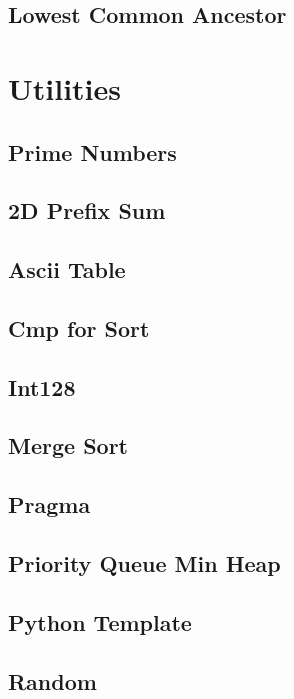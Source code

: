 \documentclass[10pt]{article}
\begin{document}
\subsection{\texorpdfstring{{Lowest Common Ancestor}}{{Lowest Common Ancestor}}}


\section{Utilities}
\subsection{\texorpdfstring{{Prime Numbers}}{{Prime Numbers}}}

\subsection{\texorpdfstring{{2D Prefix Sum}}{{2D Prefix Sum}}}

\subsection{\texorpdfstring{{Ascii Table}}{{Ascii Table}}}

\subsection{\texorpdfstring{{Cmp for Sort}}{{Cmp for Sort}}}

\subsection{\texorpdfstring{{Int128}}{{Int128}}}

\subsection{\texorpdfstring{{Merge Sort}}{{Merge Sort}}}

\subsection{\texorpdfstring{{Pragma}}{{Pragma}}}

\subsection{\texorpdfstring{{Priority Queue Min Heap}}{{Priority Queue Min Heap}}}

\subsection{\texorpdfstring{{Python Template}}{{Python Template}}}

\subsection{\texorpdfstring{{Random}}{{Random}}}

\end{document}

